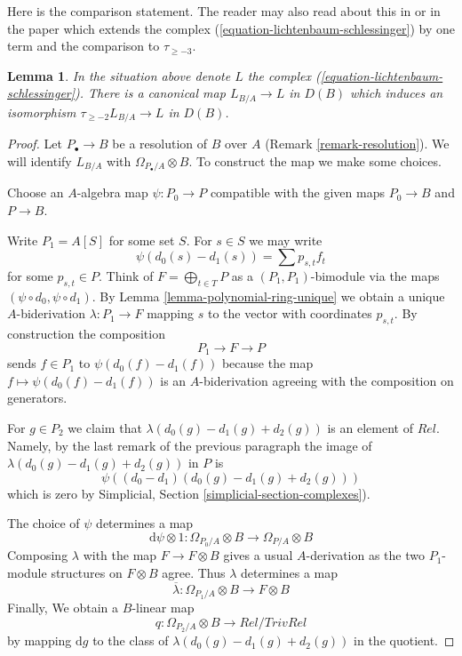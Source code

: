\documentclass{stacks-project}
\theoremstyle{plain}
\newtheorem{lemma}[subsection]{Lemma}
\theoremstyle{definition}
\theoremstyle{remark}
\numberwithin{equation}{subsection}
\begin{document}
\noindent
Here is the comparison statement. The reader may also read about this
in \cite[page 206, Proposition 12]{Andre-Homologie} or in the paper
\cite{Doncel} which extends the complex
(\ref{equation-lichtenbaum-schlessinger}) by one term and the comparison
to $\tau_{\geq -3}$.

\begin{lemma}
\label{lemma-compare-higher}
In the situation above denote $L$ the complex
(\ref{equation-lichtenbaum-schlessinger}).
There is a canonical map $L_{B/A} \to L$ in $D(B)$ which
induces an isomorphism $\tau_{\geq -2}L_{B/A} \to L$ in $D(B)$.
\end{lemma}

\begin{proof}
Let $P_\bullet \to B$ be a resolution of $B$ over $A$
(Remark \ref{remark-resolution}). We will identify $L_{B/A}$ with
$\Omega_{P_\bullet/A} \otimes B$. To construct the map we
make some choices.

\medskip\noindent
Choose an $A$-algebra map $\psi : P_0 \to P$ compatible with the
given maps $P_0 \to B$ and $P \to B$.

\medskip\noindent
Write $P_1 = A[S]$ for some set $S$. For $s \in S$ we may write
$$
\psi(d_0(s) - d_1(s)) = \sum p_{s, t} f_t
$$
for some $p_{s, t} \in P$. Think of $F = \bigoplus_{t \in T} P$
as a $(P_1, P_1)$-bimodule via the maps $(\psi \circ d_0, \psi \circ d_1)$.
By Lemma \ref{lemma-polynomial-ring-unique} we obtain a unique
$A$-biderivation $\lambda : P_1 \to F$ mapping $s$ to the vector with
coordinates $p_{s, t}$. By construction the composition
$$
P_1 \longrightarrow F \longrightarrow P
$$
sends $f \in P_1$ to $\psi(d_0(f) - d_1(f))$ because the map
$f \mapsto \psi(d_0(f) - d_1(f))$ is an $A$-biderivation agreeing with
the composition on generators.

\medskip\noindent
For $g \in P_2$ we claim that $\lambda(d_0(g) - d_1(g) + d_2(g))$
is an element of $Rel$. Namely, by the last remark of the previous
paragraph the image of $\lambda(d_0(g) - d_1(g) + d_2(g))$ in $P$ is
$$
\psi((d_0 - d_1)(d_0(g) - d_1(g) + d_2(g)))
$$
which is zero by Simplicial, Section \ref{simplicial-section-complexes}).

\medskip\noindent
The choice of $\psi$ determines a map
$$
\text{d}\psi \otimes 1 :
\Omega_{P_0/A} \otimes B
\longrightarrow
\Omega_{P/A} \otimes B
$$
Composing $\lambda$ with the map $F \to F \otimes B$ gives a
usual $A$-derivation as the two $P_1$-module structures on
$F \otimes B$ agree. Thus $\lambda$ determines a map
$$
\overline{\lambda} :
\Omega_{P_1/A} \otimes B
\longrightarrow
F \otimes B
$$
Finally, We obtain a $B$-linear map
$$
q :
\Omega_{P_2/A} \otimes B
\longrightarrow
Rel/TrivRel
$$
by mapping $\text{d}g$ to the class of $\lambda(d_0(g) - d_1(g) + d_2(g))$
in the quotient.


\end{proof}
\end{document}
